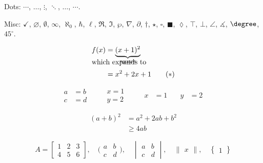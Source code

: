 \documentclass{article}
\begin{document}
Dots: $\cdots$, $\ldots$, $\vdots$, $\ddots$, $\dotsc$, $\dotsb$.

Misc: $\checkmark$, $\varnothing$, $\emptyset$, $\infty$, $\aleph_0$, $\hbar$, $\ell$, $\Re$, $\Im$, $\wp$, $\nabla$, $\partial$, $\dagger$, $\star$, $\square$, $\blacksquare$, $\lozenge$, $\top$, $\bot$, $\angle$, $\measuredangle$, $\degree$, $45^\circ$.

\begin{align}
  f(x) &= \smash{\underbrace{(x+1)^2}_{\text{square}}} \\
  \intertext{which expands to}
  &= x^2 + 2x + 1 \tag{$\ast$} \label{eq:star}
\end{align}

\begin{equation}
\begin{aligned}
  a &= b \\ c &= d
\end{aligned}
\qquad
\begin{gathered}
  x = 1 \\ y = 2
\end{gathered}
\qquad
\begin{alignedat}{2}
  x &= 1 &\quad y &= 2
\end{alignedat}
\end{equation}

\begin{equation}
\begin{split}
  (a+b)^2 &= a^2 + 2ab + b^2 \\
          &\geq 4ab
\end{split}
\end{equation}

\begin{equation}
  A = \left[\begin{array}{cc|c}
    1 & 2 & 3 \\
    \hline
    4 & 5 & 6
  \end{array}\right], \quad
  \bigl(\begin{smallmatrix} a & b \\ c & d \end{smallmatrix}\bigr), \quad
  \begin{vmatrix} a & b \\ c & d \end{vmatrix}, \quad
  \begin{Vmatrix} x \end{Vmatrix}, \quad
  \begin{Bmatrix} 1 \end{Bmatrix}
\end{equation}
\end{document}
